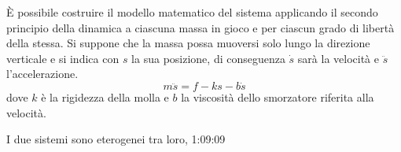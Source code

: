 È possibile costruire il modello matematico del sistema applicando il secondo principio della
dinamica a ciascuna massa in gioco e per ciascun grado di libertà della stessa.
Si suppone che la massa possa muoversi solo lungo la direzione verticale e si indica con $s$ la sua
posizione, di conseguenza $\dot{s}$ sarà la velocità e $\ddot{s}$ l'accelerazione.
\begin{equation}
 m\ddot{s} = f - ks - b\dot{s}
\end{equation}
dove $k$ è la rigidezza della molla e $b$ la viscosità dello smorzatore riferita alla velocità.

I due sistemi sono eterogenei tra loro,
1:09:09


